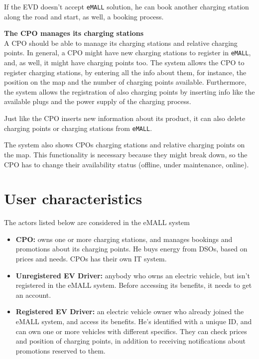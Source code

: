 If the EVD doesn't accept \verb|eMALL| solution, he can book another charging station along the road and start, as well, a booking process.

\textbf{The CPO manages its charging stations} \\
A CPO should be able to manage its charging stations and relative charging points.
In general, a CPO might have new charging stations to register in \verb|eMALL|, and, as well, it might have charging points too.
The system allows the CPO to register charging stations, by entering all the info about them, for instance, the position on the map and the number of charging points available.
Furthermore, the system allows the registration of also charging points by inserting info like the available plugs and the power supply of the charging process.

Just like the CPO inserts new information about its product, it can also delete charging points or charging stations from \verb|eMALL|\@.

The system also shows CPOs charging stations and relative charging points on the map.
This functionality is necessary because they might break down, so the CPO has to change their availability status (offline, under maintenance, online).


\section{User characteristics}
\label{sec:user_characteristics}%
The actors listed below are considered in the eMALL system
\begin{itemize}
    \item \textbf{CPO:} owns one or more charging stations, and manages bookings and promotions about its charging points.
    He buys energy from DSOs, based on prices and needs.
    CPOs has their own IT system.
    \item \textbf{Unregistered EV Driver:} anybody who owns an electric vehicle, but isn’t registered in the eMALL system.
    Before accessing its benefits, it needs to get an account.
    \item \textbf{Registered EV Driver:} an electric vehicle owner who already joined the eMALL system, and access its benefits.
    He’s identified with a unique ID, and can own one or more vehicles with different specifics.
    They can check prices and position of charging points, in addition to receiving notifications about promotions reserved to them.
\end{itemize}


